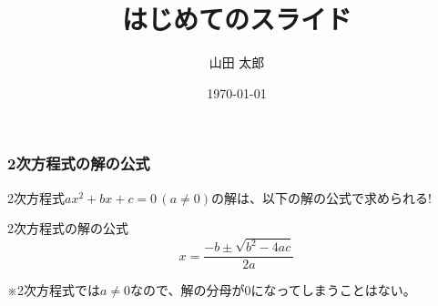 \documentclass{beamer}
\title{はじめてのスライド}
\author{山田 太郎}
\institute{羅手府大学}
\date{\today}
\begin{document}
\begin{frame}
\frametitle{2次方程式の解の公式}
2次方程式$ax^2 + bx + c = 0 \,(a\neq 0)$の解は、以下の解の公式で求められる! \pause
\begin{block}{2次方程式の解の公式}
\[ x = \frac{-b \pm \sqrt{b^2-4ac}}{2a} \]
\end{block} \pause

※2次方程式では$a\neq 0$なので、解の分母が0になってしまうことはない。
\end{frame}
\end{document}
